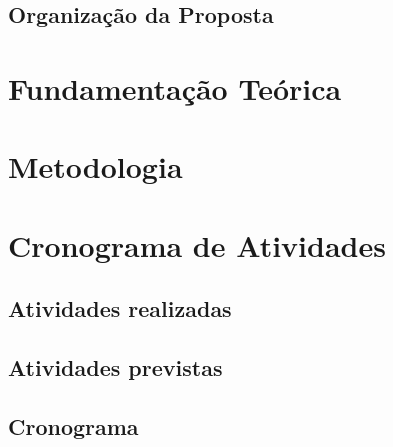 \documentclass[
	12pt,				%
	oneside,			%
	a4paper,			%
	english,			%
	french,				%
	spanish,			%
	brazil				%
	]{abntex2}
\begin{document}
\hypertarget{organizauxe7uxe3o-da-proposta}{%
\section{Organização da Proposta}\label{organizauxe7uxe3o-da-proposta}}

\hypertarget{fundamentauxe7uxe3o-teuxf3rica}{%
\chapter{Fundamentação Teórica}\label{fundamentauxe7uxe3o-teuxf3rica}}

\hypertarget{metodologia}{%
\chapter{Metodologia}\label{metodologia}}

\hypertarget{cronograma-de-atividades}{%
\chapter{Cronograma de Atividades}\label{cronograma-de-atividades}}

\hypertarget{atividades-realizadas}{%
\section{Atividades realizadas}\label{atividades-realizadas}}

\hypertarget{atividades-previstas}{%
\section{Atividades previstas}\label{atividades-previstas}}

\hypertarget{cronograma}{%
\section{Cronograma}\label{cronograma}}

\postextual

\postextual



\end{document}
